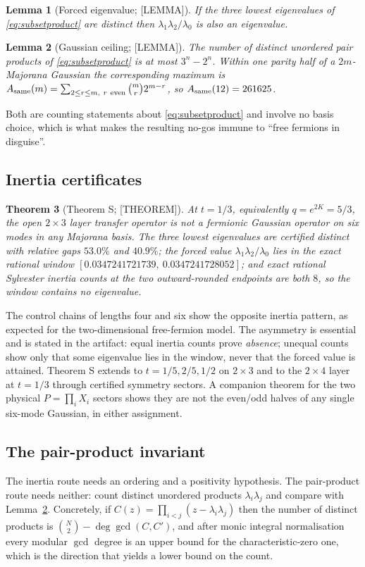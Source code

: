 \documentclass[11pt]{article}
\newtheorem{theorem}{Theorem}[section]
\newtheorem{lemma}[theorem]{Lemma}
\theoremstyle{definition}
\begin{document}
\begin{lemma}[Forced eigenvalue; {[LEMMA]}]\label{lem:forced}
If the three lowest eigenvalues of \eqref{eq:subsetproduct} are distinct then
$\lambda_1\lambda_2/\lambda_0$ is also an eigenvalue.
\end{lemma}

\begin{lemma}[Gaussian ceiling; {[LEMMA]}]\label{lem:ceiling}
The number of distinct unordered pair products of \eqref{eq:subsetproduct} is at most $3^n-2^n$.
Within one parity half of a $2m$-Majorana Gaussian the corresponding maximum is
$A_{\rm same}(m)=\sum_{2\le r\le m,\ r\ \mathrm{even}}\binom{m}{r}2^{m-r}$, so
$A_{\rm same}(12)=261625$.
\end{lemma}

Both are counting statements about \eqref{eq:subsetproduct} and involve no basis choice, which is
what makes the resulting no-gos immune to ``free fermions in disguise''.

\subsection{Inertia certificates}
\begin{theorem}[Theorem S; {[THEOREM]}]\label{thm:S}
At $t=1/3$, equivalently $q=e^{2K}=5/3$, the open $2\times3$ layer transfer operator is not a
fermionic Gaussian operator on six modes in any Majorana basis. The three lowest eigenvalues are
certified distinct with relative gaps $53.0\%$ and $40.9\%$; the forced value
$\lambda_1\lambda_2/\lambda_0$ lies in the exact rational window
$[0.0347241721739,\ 0.0347241728052]$; and exact rational Sylvester inertia counts at the two
outward-rounded endpoints are both $8$, so the window contains no eigenvalue.
\end{theorem}

The control chains of lengths four and six show the opposite inertia pattern, as expected for the
two-dimensional free-fermion model. The asymmetry is essential and is stated in the artifact: equal
inertia counts prove \emph{absence}; unequal counts show only that some eigenvalue lies in the
window, never that the forced value is attained. Theorem S extends to $t=1/5,2/5,1/2$ on $2\times3$
and to the $2\times4$ layer at $t=1/3$ through certified symmetry sectors. A companion theorem for
the two physical $P=\prod_iX_i$ sectors shows they are not the even/odd halves of any single six-mode
Gaussian, in either assignment.

\subsection{The pair-product invariant}
The inertia route needs an ordering and a positivity hypothesis. The pair-product route needs
neither: count distinct unordered products $\lambda_i\lambda_j$ and compare with
Lemma~\ref{lem:ceiling}. Concretely, if $C(z)=\prod_{i<j}(z-\lambda_i\lambda_j)$ then the number of
distinct products is $\binom{N}{2}-\deg\gcd(C,C')$, and after monic integral normalisation every
modular $\gcd$ degree is an upper bound for the characteristic-zero one, which is the direction that
yields a lower bound on the count.
\end{document}

